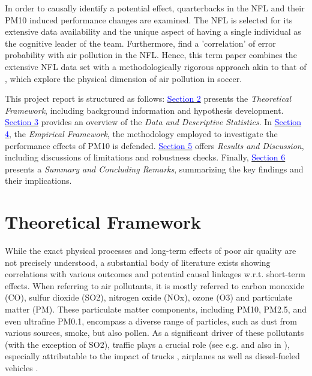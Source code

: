 \documentclass[12pt,a4paper]{article}
\newcommand{\mylink}[2]{\hyperref[#1]{\textcolor{blue}{#2}}}
\begin{document}
In order to causally identify a potential effect, quarterbacks in the NFL and their PM10 induced performance changes are examined. The NFL is selected for its extensive data availability and the unique aspect of having a single individual as the cognitive leader of the team. Furthermore, \citet{heintz2022} find a 'correlation' of error probability with air pollution in the NFL. Hence, this term paper combines the extensive NFL data set with a methodologically rigorous approach akin to that of \citet{lichter2017}, which explore the physical dimension of air pollution in soccer.

This project report is structured as follows: \mylink{2}{Section 2} presents the \textit{Theoretical Framework}, including background information and hypothesis development. \mylink{3}{Section 3} provides an overview of the \textit{Data and Descriptive Statistics}. In  \mylink{4}{Section 4}, the  \textit{Empirical Framework}, the methodology employed to investigate the performance effects of PM10 is defended. \mylink{5}{Section 5} offers \textit{Results and Discussion}, including discussions of limitations and robustness checks. Finally, \mylink{6}{Section 6} presents a \textit{Summary and Concluding Remarks}, summarizing the key findings and their implications. 

 
\clearpage
\section{Theoretical Framework}
\label{2}
While the exact physical processes and long-term effects of poor air quality are not precisely understood, a substantial body of literature exists showing correlations with various outcomes and potential causal linkages w.r.t. short-term effects. When referring to air pollutants, it is mostly referred to carbon monoxide (CO), sulfur dioxide (SO2), nitrogen oxide (NOx), ozone (O3) and particulate matter (PM). These particulate matter components, including PM10, PM2.5, and even ultrafine PM0.1, encompass a diverse range of particles, such as dust from various sources, smoke, but also pollen. As a significant driver of these pollutants (with the exception of SO2), traffic plays a crucial role (see e.g. \citealp{thorpe2008,costa2017,zhong2017} and also in \citealp{bauernschuster2017}), especially attributable to the impact of trucks \citep{lena2002}, airplanes \citep{schlenker2016} as well as diesel-fueled vehicles \citep{kinney2000}.
\end{document}
